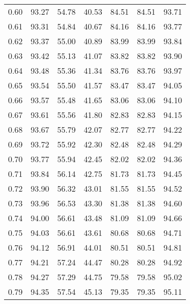 \begin{tabular}{|c|c|c|c|c|c|c|}
      0.60 &     93.27 &     54.78 &      40.53 &   84.51 &      84.51 &         93.71 \\
      0.61 &     93.31 &     54.84 &      40.67 &   84.16 &      84.16 &         93.77 \\
      0.62 &     93.37 &     55.00 &      40.89 &   83.99 &      83.99 &         93.84 \\
      0.63 &     93.42 &     55.13 &      41.07 &   83.82 &      83.82 &         93.90 \\
      0.64 &     93.48 &     55.36 &      41.34 &   83.76 &      83.76 &         93.97 \\
      0.65 &     93.54 &     55.50 &      41.57 &   83.47 &      83.47 &         94.05 \\
      0.66 &     93.57 &     55.48 &      41.65 &   83.06 &      83.06 &         94.10 \\
      0.67 &     93.61 &     55.56 &      41.80 &   82.83 &      82.83 &         94.15 \\
      0.68 &     93.67 &     55.79 &      42.07 &   82.77 &      82.77 &         94.22 \\
      0.69 &     93.72 &     55.92 &      42.30 &   82.48 &      82.48 &         94.29 \\
      0.70 &     93.77 &     55.94 &      42.45 &   82.02 &      82.02 &         94.36 \\
      0.71 &     93.84 &     56.14 &      42.75 &   81.73 &      81.73 &         94.45 \\
      0.72 &     93.90 &     56.32 &      43.01 &   81.55 &      81.55 &         94.52 \\
      0.73 &     93.96 &     56.53 &      43.30 &   81.38 &      81.38 &         94.60 \\
      0.74 &     94.00 &     56.61 &      43.48 &   81.09 &      81.09 &         94.66 \\
      0.75 &     94.03 &     56.61 &      43.61 &   80.68 &      80.68 &         94.71 \\
      0.76 &     94.12 &     56.91 &      44.01 &   80.51 &      80.51 &         94.81 \\
      0.77 &     94.21 &     57.24 &      44.47 &   80.28 &      80.28 &         94.92 \\
      0.78 &     94.27 &     57.29 &      44.75 &   79.58 &      79.58 &         95.02 \\
      0.79 &     94.35 &     57.54 &      45.13 &   79.35 &      79.35 &         95.11 \\

\end{tabular}
